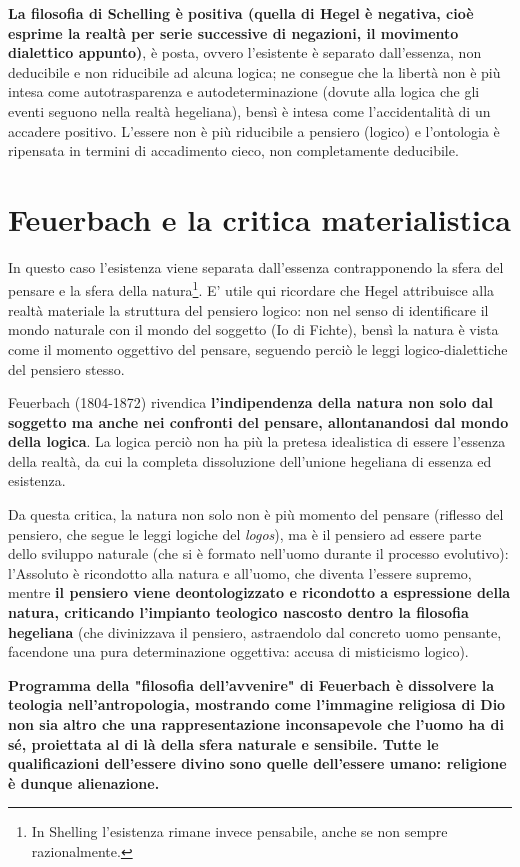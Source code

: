 \textbf{La filosofia di Schelling è positiva (quella di Hegel è negativa, cioè esprime la realtà per serie successive di negazioni, il movimento dialettico appunto)}, è posta, ovvero l'esistente è separato dall'essenza, non deducibile e non riducibile ad alcuna logica; ne consegue che la libertà non è più intesa come autotrasparenza e autodeterminazione (dovute alla logica che gli eventi seguono nella realtà hegeliana), bensì è intesa come l'accidentalità di un accadere positivo. L'essere non è più riducibile a pensiero (logico) e l'ontologia è ripensata in termini di accadimento cieco, non completamente deducibile.

\section{Feuerbach e la critica materialistica}

In questo caso l'esistenza viene separata dall'essenza contrapponendo la sfera del pensare e la sfera della natura\footnote{In Shelling l'esistenza rimane invece pensabile, anche se non sempre razionalmente.}. E' utile qui ricordare che Hegel attribuisce alla realtà materiale la struttura del pensiero logico: non nel senso di identificare il mondo naturale con il mondo del soggetto (Io di Fichte), bensì la natura è vista come il momento oggettivo del pensare, seguendo perciò le leggi logico-dialettiche del pensiero stesso.

Feuerbach (1804-1872) rivendica \textbf{l'indipendenza della natura non solo dal soggetto ma anche nei confronti del pensare, allontanandosi dal mondo della logica}. La logica perciò non ha più la pretesa idealistica di essere l'essenza della realtà, da cui la completa dissoluzione dell'unione hegeliana  di essenza ed esistenza.

Da questa critica, la natura non solo non è più momento del pensare (riflesso del pensiero, che segue le leggi logiche del \textit{logos}), ma è il pensiero ad essere parte dello sviluppo naturale (che si è formato nell'uomo durante il processo evolutivo): l'Assoluto è ricondotto alla natura e all'uomo, che diventa l'essere supremo, mentre \textbf{il pensiero viene deontologizzato  e ricondotto a espressione della natura, criticando l'impianto teologico nascosto dentro la filosofia hegeliana }(che divinizzava il pensiero, astraendolo dal concreto uomo pensante, facendone una pura determinazione oggettiva: accusa di misticismo logico).

\textbf{Programma della "filosofia dell'avvenire" di Feuerbach  è dissolvere la teologia nell'antropologia, mostrando come l'immagine religiosa di Dio non sia altro che una rappresentazione inconsapevole che l'uomo ha di sé, proiettata al di là della sfera naturale e sensibile. Tutte le qualificazioni dell'essere divino sono quelle dell'essere umano: religione è dunque alienazione.}

